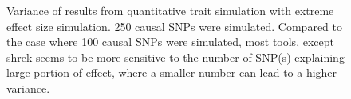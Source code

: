 \begin{figure}
{				
				\label{fig:ldscInQtEx250cVar}
			}
			\caption[Quantitative Trait with Extreme Effect Size Simulation Result(250 causal SNPs, Variance)]
			{Variance of results from quantitative trait simulation with extreme effect size simulation.
				250 causal \glspl{SNP} were simulated.
				Compared to the case where 100 causal \glspl{SNP} were simulated, most tools, except \gls{shrek} seems to be more sensitive to the number of \gls{SNP}(s) explaining large portion of effect, where a smaller number can lead to a higher variance.
			} 
			\label{fig:QtEx250cVar}
		\end{figure}
		
